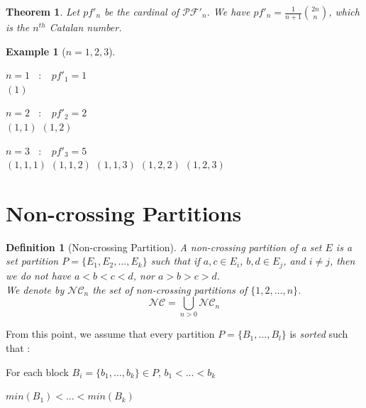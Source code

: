 \documentclass[12pt]{report}
\newtheorem{theorem}{Theorem}
\newtheorem{definition}{Definition}
\newtheorem*{example}{Example}
\begin{document}
\begin{theorem}
    Let $pf'_n$ be the cardinal of $\mathcal{PF'}_n$.
    We have $pf'_n = \frac{1}{n + 1} \binom{2n}{n}$,
    which is the $n^{th}$ Catalan number.
\end{theorem}

\begin{example}[$n = 1, 2, 3$]
    ~\\
    \begin{itemize*}
        \item $n = 1$ \  $:$ \  $pf'_1 = 1$\\
        \subitem $(1)$\\
        \item $n = 2$ \  $:$ \  $pf'_2 = 2$\\
        \subitem $(1, 1)$
        \subitem $(1, 2)$\\
        \item $n = 3$ \  $:$ \  $pf'_3 = 5$\\
        \subitem $(1, 1, 1)$
        \subitem $(1, 1, 2)$
        \subitem $(1, 1, 3)$
        \subitem $(1, 2, 2)$
        \subitem $(1, 2, 3)$\\
    \end{itemize*}
\end{example}

\section{Non-crossing Partitions}

\begin{definition}[Non-crossing Partition]
    A \emph{non-crossing partition} of a set $E$ is
    a set partition $P = \{E_1, E_2, \ldots, E_k\}$ such that
    if $a, c \in E_i$, $b, d \in E_j$, and $i \neq j$, then
    we do \emph{not} have $a < b < c < d$, nor $a > b > c > d$.\\
    We denote by $\mathcal{NC}_n$ the set of non-crossing partitions
    of $\{1, 2, \ldots, n\}$.
    $$\mathcal{NC} = \bigcup_{n > 0}{\mathcal{NC}_n}$$
\end{definition}

From this point, we assume that every partition $P = \{B_1, \ldots, B_l\}$
is \emph{sorted} such that :\\
\begin{itemize*}
    \item For each block $B_i = \{b_1, \ldots, b_k\} \in P$,
        $b_1 < \ldots < b_k$\\
    \item $min (B_1) < \ldots < min (B_k)$\\
\end{itemize*}
\end{document}
